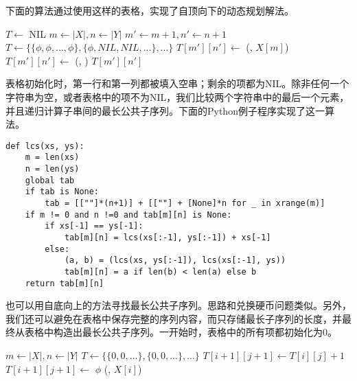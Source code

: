 \documentclass[UTF8]{article}
\begin{document}
下面的算法通过使用这样的表格，实现了自顶向下的动态规划解法。

\begin{algorithmic}[1]
\State $T \gets$ NIL
  \State $m \gets |X|, n \gets |Y|$
  \State $m' \gets m+1, n' \gets n+1$
    \State $T \gets \{\{\phi, \phi, ..., \phi\}, \{\phi, NIL, NIL, ...\}, ...\}$ 
  \EndIf
      \State $T[m'][n'] \gets$ (, $X[m]$)
    \Else
      \State $T[m'][n'] \gets$ (, )
    \EndIf
  \EndIf
  \State \Return $T[m'][n']$
\EndFunction
\end{algorithmic}

表格初始化时，第一行和第一列都被填入空串；剩余的项都为NIL。除非任何一个字符串为空，或者表格中的项不为NIL，我们比较两个字符串中的最后一个元素，并且递归计算子串间的最长公共子序列。下面的Python例子程序实现了这一算法。

\lstset{language=Python}
\begin{lstlisting}
def lcs(xs, ys):
    m = len(xs)
    n = len(ys)
    global tab
    if tab is None:
        tab = [[""]*(n+1)] + [[""] + [None]*n for _ in xrange(m)]
    if m != 0 and n !=0 and tab[m][n] is None:
        if xs[-1] == ys[-1]:
            tab[m][n] = lcs(xs[:-1], ys[:-1]) + xs[-1]
        else:
            (a, b) = (lcs(xs, ys[:-1]), lcs(xs[:-1], ys))
            tab[m][n] = a if len(b) < len(a) else b
    return tab[m][n]
\end{lstlisting}

也可以用自底向上的方法寻找最长公共子序列。思路和兑换硬币问题类似。另外，我们还可以避免在表格中保存完整的序列内容，而只存储最长子序列的长度，并最终从表格中构造出最长公共子序列。一开始时，表格中的所有项都初始化为0。

\begin{algorithmic}[1]
  \State $m \gets |X|, n \gets |Y|$
  \State $T \gets \{\{0, 0, ...\}, \{0, 0, ...\}, ...\}$ 
        \State $T[i+1][j+1] \gets T[i][j] + 1$
      \Else
        \State $T[i+1][j+1] \gets$ 
      \EndIf
    \EndFor
  \EndFor
  \State \Return {}
\EndFunction
\Statex
{}
    \State \Return $\phi$
    \State \Return {}(, $X[i]$)
    \State \Return {}
  \Else
    \State \Return {}
  \EndIf
\EndFunction
\end{algorithmic}
\end{document}
